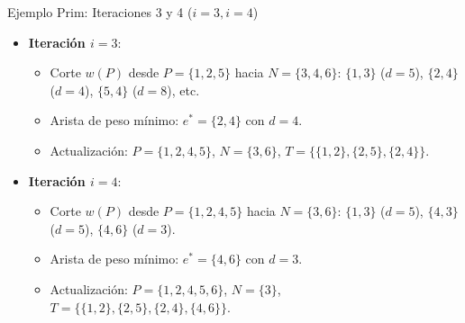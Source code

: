 \documentclass[
  ignorenonframetext,
]{beamer}
\providecommand{\tightlist}{%
  \setlength{\itemsep}{0pt}\setlength{\parskip}{0pt}}
\begin{document}
\begin{frame}{Ejemplo Prim: Iteraciones 3 y 4 (\(i=3, i=4\))}
\label{ejemplo-prim-iteraciones-3-y-4-i3-i4}
\begin{itemize}
\tightlist
\item
  \textbf{Iteración \(i=3\)}:

  \begin{itemize}
  \tightlist
  \item
    Corte \(w(P)\) desde \(P = \{1, 2, 5\}\) hacia \(N = \{3, 4, 6\}\):
    \(\{1, 3\}\) (\(d=5\)), \(\{2, 4\}\) (\(d=4\)), \(\{5, 4\}\)
    (\(d=8\)), etc.
  \item
    Arista de peso mínimo: \(e^* = \{2, 4\}\) con \(d=4\).
  \item
    Actualización: \(P = \{1, 2, 4, 5\}\), \(N = \{3, 6\}\),
    \(T = \{\{1, 2\}, \{2, 5\}, \{2, 4\}\}\).
  \end{itemize}
\item
  \textbf{Iteración \(i=4\)}:

  \begin{itemize}
  \tightlist
  \item
    Corte \(w(P)\) desde \(P = \{1, 2, 4, 5\}\) hacia \(N = \{3, 6\}\):
    \(\{1, 3\}\) (\(d=5\)), \(\{4, 3\}\) (\(d=5\)), \(\{4, 6\}\)
    (\(d=3\)).
  \item
    Arista de peso mínimo: \(e^* = \{4, 6\}\) con \(d=3\).
  \item
    Actualización: \(P = \{1, 2, 4, 5, 6\}\), \(N = \{3\}\),
    \(T = \{\{1, 2\}, \{2, 5\}, \{2, 4\}, \{4, 6\}\}\).
  \end{itemize}
\end{itemize}
\end{frame}
\end{document}
